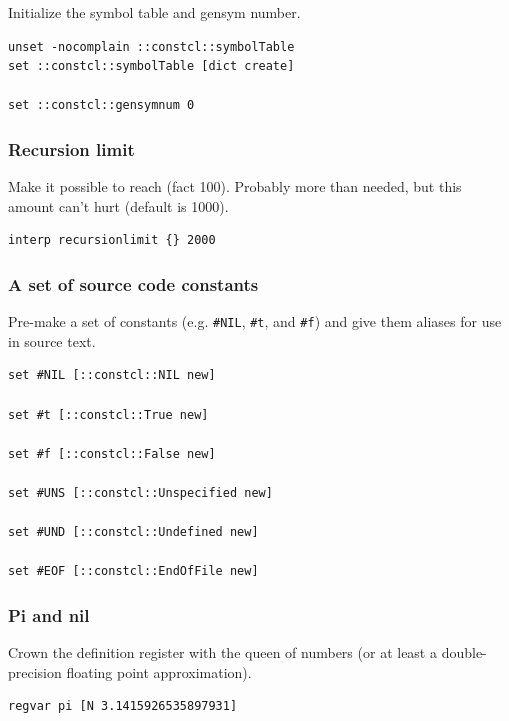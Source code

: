 \documentclass[a5paper,draft]{memoir}
\begin{document}
Initialize the symbol table and gensym number.

\begin{lstlisting}
unset -nocomplain ::constcl::symbolTable
set ::constcl::symbolTable [dict create]

set ::constcl::gensymnum 0
\end{lstlisting}

\subsubsection{Recursion limit}
\label{recursion-limit}

Make it possible to reach (fact 100). Probably more than needed, but this amount can't hurt (default is 1000).

\begin{lstlisting}
interp recursionlimit {} 2000
\end{lstlisting}

\subsubsection{A set of source code constants}
\label{a-set-of-source-code-constants}

Pre-make a set of constants (e.g. \texttt{\#NIL}, \texttt{\#t}, and \texttt{\#f}) and give them aliases for use in source text.

\begin{lstlisting}
set #NIL [::constcl::NIL new]

set #t [::constcl::True new]

set #f [::constcl::False new]

set #UNS [::constcl::Unspecified new]

set #UND [::constcl::Undefined new]

set #EOF [::constcl::EndOfFile new]
\end{lstlisting}

\subsubsection{Pi and nil}
\label{pi-and-nil}

Crown the definition register with the queen of numbers (or at least a double-precision floating point approximation).

\begin{lstlisting}
regvar pi [N 3.1415926535897931]
\end{lstlisting}
\end{document}
